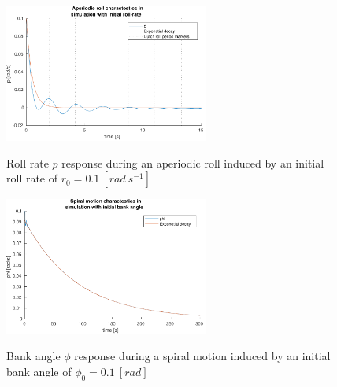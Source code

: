 \begin{figure}[ht]
    \centering
    \includegraphics[width=0.6\textwidth]{figures/ol_ap}
    \label{fig:ol_ap}
    \caption{Roll rate $p$ response during an aperiodic roll induced by an initial roll rate of $r_0=0.1\ [rad\ s^{-1}]$}
\end{figure}

\begin{figure}[ht]
    \centering
    \includegraphics[width=0.6\textwidth]{figures/ol_si}
    \label{fig:ol_si}
    \caption{Bank angle $\phi$ response during a spiral motion induced by an initial bank angle of $\phi_0=0.1\ [rad]$}
\end{figure}
